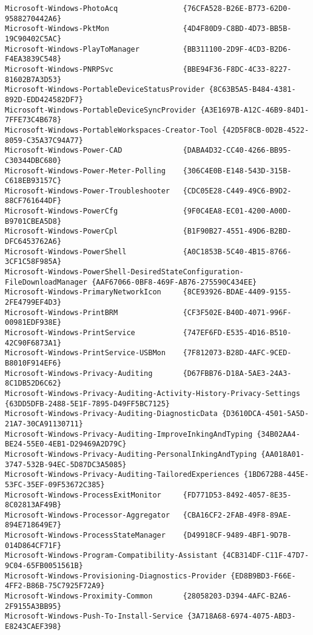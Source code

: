 \documentclass{report}
\begin{document}
\begin{lstlisting}[breaklines=true,basicstyle=\tiny]
Microsoft-Windows-PhotoAcq               {76CFA528-B26E-B773-62D0-9588270442A6}
Microsoft-Windows-PktMon                 {4D4F80D9-C8BD-4D73-BB5B-19C90402C5AC}
Microsoft-Windows-PlayToManager          {BB311100-2D9F-4CD3-B2D6-F4EA3839C548}
Microsoft-Windows-PNRPSvc                {BBE94F36-F8DC-4C33-8227-81602B7A3D53}
Microsoft-Windows-PortableDeviceStatusProvider {8C63B5A5-B484-4381-892D-EDD424582DF7}
Microsoft-Windows-PortableDeviceSyncProvider {A3E1697B-A12C-46B9-84D1-7FFE73C4B678}
Microsoft-Windows-PortableWorkspaces-Creator-Tool {42D5F8CB-0D2B-4522-8059-C35A37C94A77}
Microsoft-Windows-Power-CAD              {DABA4D32-CC40-4266-BB95-C30344DBC680}
Microsoft-Windows-Power-Meter-Polling    {306C4E0B-E148-543D-315B-C618EB93157C}
Microsoft-Windows-Power-Troubleshooter   {CDC05E28-C449-49C6-B9D2-88CF761644DF}
Microsoft-Windows-PowerCfg               {9F0C4EA8-EC01-4200-A00D-B9701CBEA5D8}
Microsoft-Windows-PowerCpl               {B1F90B27-4551-49D6-B2BD-DFC6453762A6}
Microsoft-Windows-PowerShell             {A0C1853B-5C40-4B15-8766-3CF1C58F985A}
Microsoft-Windows-PowerShell-DesiredStateConfiguration-FileDownloadManager {AAF67066-0BF8-469F-AB76-275590C434EE}
Microsoft-Windows-PrimaryNetworkIcon     {8CE93926-BDAE-4409-9155-2FE4799EF4D3}
Microsoft-Windows-PrintBRM               {CF3F502E-B40D-4071-996F-00981EDF938E}
Microsoft-Windows-PrintService           {747EF6FD-E535-4D16-B510-42C90F6873A1}
Microsoft-Windows-PrintService-USBMon    {7F812073-B28D-4AFC-9CED-B8010F914EF6}
Microsoft-Windows-Privacy-Auditing       {D67FBB76-D18A-5AE3-24A3-8C1DB52D6C62}
Microsoft-Windows-Privacy-Auditing-Activity-History-Privacy-Settings {63DD5DFB-2488-5E1F-7895-D49FF5BC7125}
Microsoft-Windows-Privacy-Auditing-DiagnosticData {D3610DCA-4501-5A5D-21A7-30CA91130711}
Microsoft-Windows-Privacy-Auditing-ImproveInkingAndTyping {34B02AA4-BE24-55E0-4EB1-D29469A2D79C}
Microsoft-Windows-Privacy-Auditing-PersonalInkingAndTyping {AA018A01-3747-532B-94EC-5D87DC3A5085}
Microsoft-Windows-Privacy-Auditing-TailoredExperiences {1BD672B8-445E-53FC-35EF-09F53672C385}
Microsoft-Windows-ProcessExitMonitor     {FD771D53-8492-4057-8E35-8C02813AF49B}
Microsoft-Windows-Processor-Aggregator   {CBA16CF2-2FAB-49F8-89AE-894E718649E7}
Microsoft-Windows-ProcessStateManager    {D49918CF-9489-4BF1-9D7B-014D864CF71F}
Microsoft-Windows-Program-Compatibility-Assistant {4CB314DF-C11F-47D7-9C04-65FB0051561B}
Microsoft-Windows-Provisioning-Diagnostics-Provider {ED8B9BD3-F66E-4FF2-B86B-75C7925F72A9}
Microsoft-Windows-Proximity-Common       {28058203-D394-4AFC-B2A6-2F9155A3BB95}
Microsoft-Windows-Push-To-Install-Service {3A718A68-6974-4075-ABD3-E8243CAEF398}

\end{lstlisting}
\end{document}
